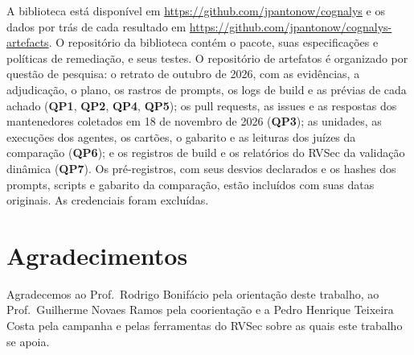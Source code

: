 \documentclass[conference]{IEEEtran}
\newcommand{\researchq}[1]{\textbf{QP#1}}
\begin{document}
A biblioteca está disponível em \url{https://github.com/jpantonow/cognalys} e os
dados por trás de cada resultado em \url{https://github.com/jpantonow/cognalys-artefacts}. O repositório da
biblioteca contém o pacote, suas especificações e políticas de remediação, e seus
testes. O repositório de artefatos é organizado por questão de pesquisa: o retrato de
outubro de 2026, com as evidências, a adjudicação, o plano, os rastros de prompts, os
logs de build e as prévias de cada achado (\researchq{1}, \researchq{2},
\researchq{4}, \researchq{5}); os pull requests, as issues e as respostas dos
mantenedores coletados em 18 de novembro de 2026 (\researchq{3}); as unidades, as
execuções dos agentes, os cartões, o gabarito e as leituras dos juízes da comparação
(\researchq{6}); e os registros de build e os relatórios do RVSec da validação dinâmica
(\researchq{7}). Os pré-registros, com seus desvios declarados e os hashes dos prompts,
scripts e gabarito da comparação, estão incluídos com suas datas originais. As
credenciais foram excluídas.

\section*{Agradecimentos}

Agradecemos ao Prof.\ Rodrigo Bonifácio pela orientação deste trabalho, ao
Prof.\ Guilherme Novaes Ramos pela coorientação e a Pedro Henrique Teixeira Costa
pela campanha e pelas ferramentas do RVSec sobre as quais este trabalho se apoia.



\end{document}

